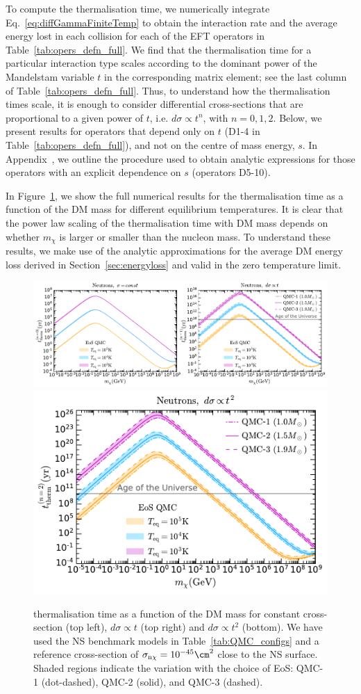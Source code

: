 To compute the thermalisation time, we numerically integrate Eq.~\ref{eq:diffGammaFiniteTemp} to obtain the interaction rate and the average energy lost in each collision for each of the EFT operators in Table~\ref{tab:opers_defn_full}. We find that the thermalisation time for a particular interaction type scales according to the dominant power of the Mandelstam variable $t$ in the corresponding matrix element; see the last column of  Table~\ref{tab:opers_defn_full}. Thus, to understand how the thermalisation times scale, it is enough to consider differential cross-sections that are proportional to a given power of $t$, i.e. $d\sigma\propto t^n$, with $n=0,1,2$. 
Below, we present results for operators that depend only on $t$ (D1-4 in Table~\ref{tab:opers_defn_full}), and not on the centre of mass energy, $s$. In Appendix~, we outline the procedure used to obtain analytic expressions for those operators with an explicit dependence on $s$ (operators D5-10). 


In Figure~\ref{fig:thermtime}, we show the full numerical results for the thermalisation time as a function of the DM mass for different equilibrium temperatures. It is clear that the power law scaling of the thermalisation time with DM mass depends on whether $m_\chi$ is larger or smaller than the nucleon mass. To understand these results, we make use of the analytic approximations for the average DM energy loss derived in Section~\ref{sec:energyloss} and valid in the zero temperature limit. 

\begin{figure}
\centering 
  \includegraphics[width=\textwidth]{ttherm_mdm_n0_n1.pdf}
  \includegraphics[width=.525\textwidth]{ttherm_n2_eos.pdf}
  \caption{thermalisation time as a function of the DM mass for constant cross-section (top left), $d\sigma \propto t$ (top right)  and $d\sigma\propto t^2$ (bottom). We have used the NS benchmark models in Table~\ref{tab:QMC_configs} and a reference cross-section of $\sigma_{\rm n\chi}= 10^{-45}\cm^2$ close to the NS surface. Shaded regions indicate the variation with the choice of EoS: QMC-1 (dot-dashed), QMC-2 (solid), and QMC-3 (dashed). 
  }
  \label{fig:thermtime}
\end{figure}


